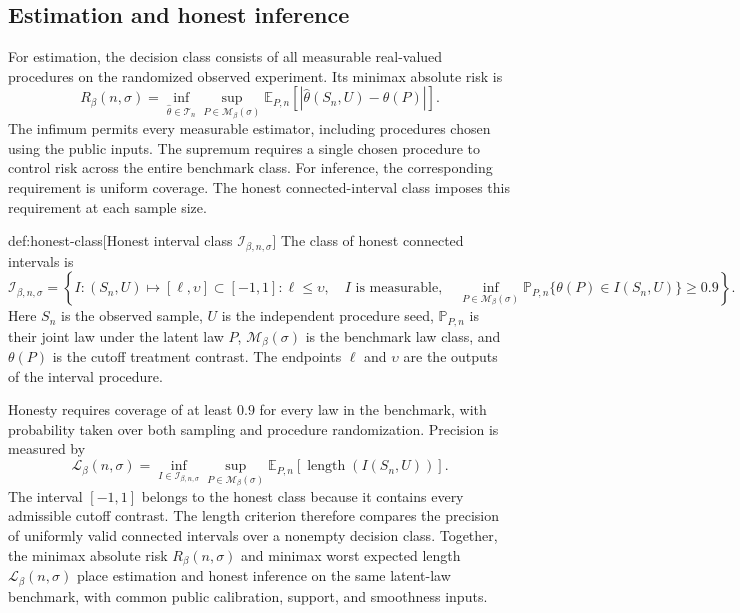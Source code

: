\documentclass[11pt]{article}
\begin{document}
\subsection{Estimation and honest inference}

For estimation, the decision class  consists of all measurable real-valued procedures on the randomized observed experiment. Its minimax absolute risk is
\[
R_\beta(n,\sigma)
=
\inf_{\widehat\theta\in\mathcal T_n}
\sup_{P\in\mathcal M_\beta(\sigma)}
\mathbb E_{P,n}\!\left[|\widehat\theta(S_n,U)-\theta(P)|\right].
\]
The infimum permits every measurable estimator, including procedures chosen using the public inputs. The supremum requires a single chosen procedure to control risk across the entire benchmark class. For inference, the corresponding requirement is uniform coverage. The honest connected-interval class  imposes this requirement at each sample size.

\begin{definitionv}{def:honest-class}[Honest interval class $\mathcal I_{\beta,n,\sigma}$]
The class of honest connected intervals is
\[
\mathcal I_{\beta,n,\sigma}
=
\left\{
I:(S_n,U)\mapsto[\ell,\upsilon]\subset[-1,1]:
\ell\le\upsilon,\quad
I\text{ is measurable},\quad
\inf_{P\in\mathcal M_\beta(\sigma)}
\mathbb P_{P,n}\{\theta(P)\in I(S_n,U)\}\ge0.9
\right\}.
\]
Here \(S_n\) is the observed sample, \(U\) is the independent procedure seed, \(\mathbb P_{P,n}\) is their joint law under the latent law \(P\), \(\mathcal M_\beta(\sigma)\) is the benchmark law class, and \(\theta(P)\) is the cutoff treatment contrast. The endpoints \(\ell\) and \(\upsilon\) are the outputs of the interval procedure.
\end{definitionv}

Honesty requires coverage of at least \(0.9\) for every law in the benchmark, with probability taken over both sampling and procedure randomization. Precision is measured by
\[
\mathcal L_\beta(n,\sigma)
=
\inf_{I\in\mathcal I_{\beta,n,\sigma}}
\sup_{P\in\mathcal M_\beta(\sigma)}
\mathbb E_{P,n}\!\left[\operatorname{length}(I(S_n,U))\right].
\]
The interval \([-1,1]\) belongs to the honest class because it contains every admissible cutoff contrast. The length criterion therefore compares the precision of uniformly valid connected intervals over a nonempty decision class. Together, the minimax absolute risk \(R_\beta(n,\sigma)\) and minimax worst expected length \(\mathcal L_\beta(n,\sigma)\) place estimation and honest inference on the same latent-law benchmark, with common public calibration, support, and smoothness inputs.
\end{document}

